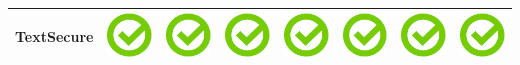 \documentclass[10pt,foldmark,tumble]{leaflet}
\begin{document}
{{\begin{tabular}{ L{2cm} | C{2cm} | C{2cm} | C{2cm} | C{2cm} | C{2cm} | C{2cm} | C{2cm} | }
TextSecure & \includegraphics[scale=0.1]{pics/haken.png} & \includegraphics[scale=0.1]{pics/haken.png} & \includegraphics[scale=0.1]{pics/haken.png} & \includegraphics[scale=0.1]{pics/haken.png} & \includegraphics[scale=0.1]{pics/haken.png} & \includegraphics[scale=0.1]{pics/haken.png} & \includegraphics[scale=0.1]{pics/haken.png} \tabularnewline
\hline
\end{tabular}
} %
} %
 
\end{document}
